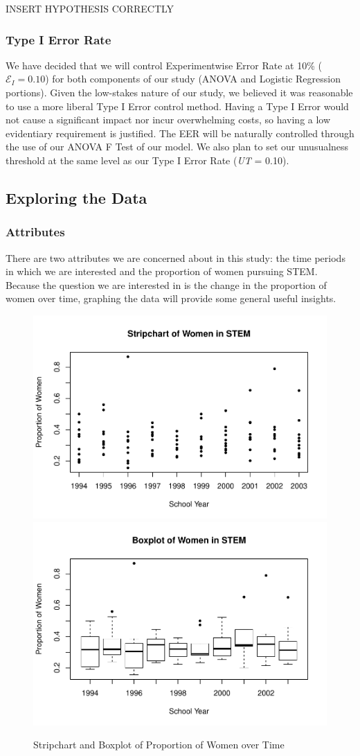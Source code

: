\documentclass[]{article}
\begin{document}
INSERT HYPOTHESIS CORRECTLY

\subsubsection{Type I Error Rate}\label{type-i-error-rate}

We have decided that we will control Experimentwise Error Rate at 10\%
(\(\mathcal{E}_{I}=0.10\)) for both components of our study (ANOVA and
Logistic Regression portions). Given the low-stakes nature of our study,
we believed it was reasonable to use a more liberal Type I Error control
method. Having a Type I Error would not cause a significant impact nor
incur overwhelming costs, so having a low evidentiary requirement is
justified. The EER will be naturally controlled through the use of our
ANOVA F Test of our model. We also plan to set our unusualness threshold
at the same level as our Type I Error Rate (\emph{UT} = 0.10).

\subsection{Exploring the Data}\label{exploring-the-data}

\subsubsection{Attributes}\label{attributes}

There are two attributes we are concerned about in this study: the time
periods in which we are interested and the proportion of women pursuing
STEM. Because the question we are interested in is the change in the
proportion of women over time, graphing the data will provide some
general useful insights.

\begin{figure}
\includegraphics[width=.49\linewidth]{Stat_461_Final_Project_Report_files/figure-latex/strip-1} \includegraphics[width=.49\linewidth]{Stat_461_Final_Project_Report_files/figure-latex/strip-2} \caption{Stripchart and Boxplot of Proportion of Women over Time}\label{fig:strip}
\end{figure}
\end{document}
